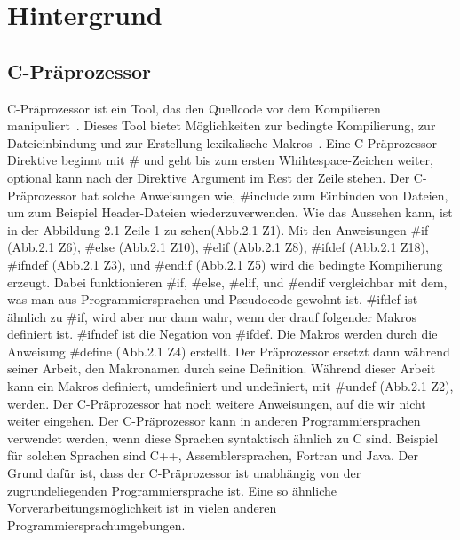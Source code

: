 \chapter{Hintergrund}
\section{C-Präprozessor}
C-Präprozessor ist ein Tool, das den Quellcode vor dem Kompilieren manipuliert~\cite{ABKS13}. Dieses Tool bietet Möglichkeiten zur bedingte Kompilierung, zur  Dateieinbindung und zur Erstellung lexikalische Makros~\cite{ABKS13}. Eine C-Präprozessor-Direktive beginnt mit \# und geht bis zum ersten Whihtespace-Zeichen weiter, optional kann nach der Direktive Argument im Rest der Zeile stehen. Der C-Präprozessor hat solche Anweisungen wie, \#include zum Einbinden von Dateien, um zum Beispiel Header-Dateien wiederzuverwenden. Wie das Aussehen kann, ist in der Abbildung 2.1 Zeile 1 zu sehen(Abb.2.1 Z1). Mit den Anweisungen \#if (Abb.2.1 Z6), \#else (Abb.2.1 Z10), \#elif (Abb.2.1 Z8), \#ifdef (Abb.2.1 Z18), \#ifndef (Abb.2.1 Z3), und \#endif (Abb.2.1 Z5) wird die bedingte Kompilierung erzeugt. Dabei funktionieren \#if, \#else, \#elif, und \#endif vergleichbar mit dem, was man aus Programmiersprachen und Pseudocode gewohnt ist. \#ifdef ist ähnlich zu \#if, wird aber nur dann wahr, wenn der drauf folgender Makros definiert ist. \#ifndef ist die Negation von \#ifdef. Die Makros werden durch die Anweisung \#define (Abb.2.1 Z4) erstellt. Der Präprozessor ersetzt dann während seiner Arbeit, den Makronamen durch seine Definition. Während dieser Arbeit kann ein Makros definiert, umdefiniert und undefiniert, mit \#undef (Abb.2.1 Z2), werden. Der C-Präprozessor hat noch weitere Anweisungen, auf die wir nicht weiter eingehen. Der C-Präprozessor kann in anderen Programmiersprachen verwendet werden, wenn diese Sprachen syntaktisch ähnlich zu C sind. Beispiel für solchen Sprachen sind C++, Assemblersprachen, Fortran und Java. Der Grund dafür ist, dass der C-Präprozessor ist unabhängig von der zugrundeliegenden Programmiersprache ist. Eine so ähnliche Vorverarbeitungsmöglichkeit ist in vielen anderen Programmiersprachumgebungen.



